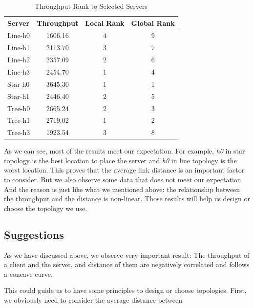 \begin{table}[ht]
\centering
	\caption{Throughput Rank to Selected Servers}
	\label{table:throughput}
	\begin{tabular}{|l||c|c|c|}
		\hline 
		Server   &  Throughput & Local Rank & Global Rank \\ \hline\hline
		Line-h0  &   1606.16  &  4   &  9 \\ \hline 
		Line-h1  &   2113.70  &  3   &  7 \\ \hline 
		Line-h2  &   2357.09  &  2   &  6 \\ \hline 
		Line-h3  &   2454.70  &  1   &  4 \\ \hline\hline 
		Star-h0  &   3645.30  &  1   &  1 \\ \hline 
        Star-h1  &   2446.40  &  2   &  5 \\ \hline\hline 
		Tree-h0  &   2665.24  &  2   &  3 \\ \hline 
		Tree-h1  &   2719.02  &  1   &  2 \\ \hline 
		Tree-h3  &   1923.54  &  3   &  8 \\ \hline 
	\end{tabular}
\end{table}
As we can see, most of the results meet our expectation. For example, {\it h0} in 
star topology is the best location to place the server and {\it h0} in line topology 
is the worst location. This proves that the average link 
distance is an important factor to consider. But we also observe some data that does not 
meet our expectation. And the reason is just like what we mentioned above: the relationship 
between the throughput and the distance is non-linear. Those results will help
us design or choose the topology we use.

\subsection{Suggestions} \label{subsec:suggestions}
As we have discussed above, we observe very important result:
The throughput of a client and the server, and distance of them are negatively correlated 
and follows a concave curve.

This could guide us to have some principles to design or choose topologies. First, we obviously 
need to consider the average distance between 
